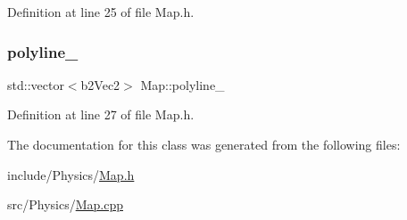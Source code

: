 Definition at line 25 of file Map.\+h.

\mbox{\label{classMap_a6bb2e5bde1854c9ceb4ad7d0349aa878}} 
\subsubsection{\texorpdfstring{polyline\+\_\+}{polyline\_}}
{\footnotesize\ttfamily std\+::vector$<$b2\+Vec2$>$ Map\+::polyline\+\_\+\hspace{0.3cm}{\ttfamily [private]}}



Definition at line 27 of file Map.\+h.



The documentation for this class was generated from the following files\+:\begin{DoxyCompactItemize}
\item 
include/\+Physics/\hyperlink{Map_8h}{Map.\+h}\item 
src/\+Physics/\hyperlink{Map_8cpp}{Map.\+cpp}\end{DoxyCompactItemize}
